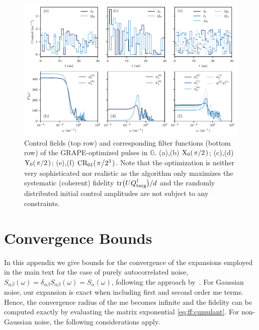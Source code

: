 \begin{figure}
    \centering
    \includegraphics{img/pdf/filter_functions/qft_atomic_pulses}
    \caption{
        Control fields (top row) and corresponding filter functions (bottom row) of the GRAPE-optimized pulses in $\mathbb{G}$.
        (a),(b) $\text{X}_0(\flatfrac{\pi}{2})$; (c),(d) $\text{Y}_0(\flatfrac{\pi}{2})$; (e),(f) $\text{CR}_{01}(\flatfrac{\pi}{2^3})$.
        Note that the optimization is neither very sophisticated nor realistic as the algorithm only maximizes the systematic (coherent) fidelity $\mathrm{tr}\bigl(UQ^\dagger_{\mathrm{targ}}\bigr)/d$ and the randomly distributed initial control amplitudes are not subject to any constraints.
    }
    \label{appfig:ff:qft:gates}
\end{figure}

\section{Convergence Bounds}\label{sec:app:ff:convergence}
In this appendix we give bounds for the convergence of the expansions employed in the main text for the case of purely autocorrelated noise, $S_{\alpha\beta}(\omega) = \delta_{\alpha\beta}S_{\alpha\beta}(\omega) =  S_\alpha(\omega)$, following the approach by~\citet{Green2013}.
For Gaussian noise, our expansion is exact when including first and second order \acrfull{me} terms.
Hence, the convergence radius of the \gls{me} becomes infinite and the fidelity can be computed exactly by evaluating the matrix exponential \cref{eq:ff:cumulant}.
For non-Gaussian noise, the following considerations apply.
